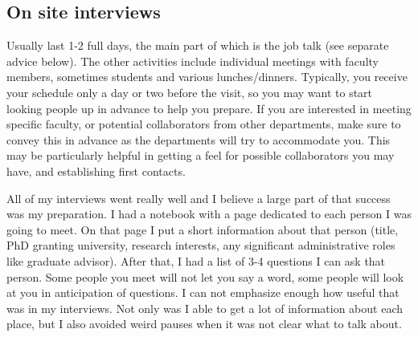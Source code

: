 \documentclass{article}
\begin{document}
\subsection{On site interviews}
Usually last 1-2 full days, the main part of which is the job talk (see separate advice below). The other activities include individual meetings with faculty members, sometimes students and various lunches/dinners. {\color{red} Typically, you receive your schedule only a day or two before the visit, so you may want to start looking people up in advance to help you prepare. If you are interested in meeting specific faculty, or potential collaborators from other departments, make sure to convey this in advance as the departments will try to accommodate you. This may be particularly helpful in getting a feel for possible collaborators you may have, and establishing first contacts.}

All of my interviews went really well and I believe a large part of that success was my preparation. I had a notebook with a page dedicated to each person I was going to meet. On that page I put a short information about that person (title, PhD granting university, research interests, any significant administrative roles like graduate advisor). After that, I had a list of 3-4 questions I can ask that person. Some people you meet will not let you say a word, some people will look at you in anticipation of questions. I can not emphasize enough how useful that was in my interviews. Not only was I able to get a lot of information about each place, but I also avoided weird pauses when it was not clear what to talk about.
\end{document}
